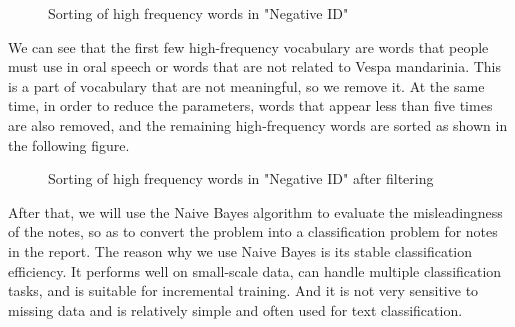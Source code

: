 \documentclass{mcmthesis}
\numberwithin{figure}{section}
\numberwithin{table}{section}
\begin{document}
\begin{figure}[H]
  \caption{Sorting of high frequency words in "Negative ID"}\label{sohfw}
\end{figure}

We can see that the first few high-frequency vocabulary are words that people must use in oral speech or words that are not related to Vespa mandarinia. This is a part of vocabulary that are not meaningful, so we remove it. At the same time, in order to reduce the parameters, words that appear less than five times are also removed, and the remaining high-frequency words are sorted as shown in the following figure.

\begin{figure}[H]
  \caption{Sorting of high frequency words in "Negative ID" after filtering}\label{sohfwaf}
\end{figure}

After that, we will use the Naive Bayes algorithm to evaluate the misleadingness of the notes, so as to convert the problem into a classification problem for notes in the report. The reason why we use Naive Bayes is its stable classification efficiency. It performs well on small-scale data, can handle multiple classification tasks, and is suitable for incremental training. And it is not very sensitive to missing data and is relatively simple and often used for text classification.
\end{document}
